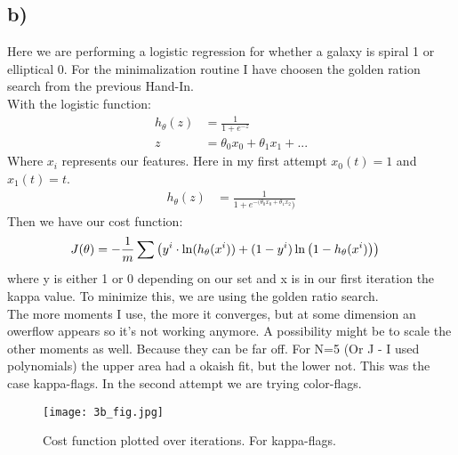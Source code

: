 \subsection{b)}
Here we are performing a logistic regression for whether a galaxy is spiral 1 or elliptical 0. For the minimalization routine I have choosen the golden ration search from the previous Hand-In. \\
With the logistic function: 
\begin{align}
    h_\theta(z) &= \frac{1}{1+e^{-z}}\\
    z &= \theta_0 x_0 + \theta_1 x_1 + ... 
\end{align}
Where $x_i$ represents our features. Here in my first attempt  $x_0(t) = 1$ and $x_{1}(t) = t$. 
\begin{align}
    h_\theta(z) &= \frac{1}{1+e^{-(\theta_0 x_0+ \theta_1 x_2})}
\end{align}
Then we have our cost function: 
\begin{align}
    J(\theta) &= - \frac{1}{m} \sum \left({y^{i}  \cdot \ln(h_\theta (x^{i})) + (1-y^{i})\ln\left({1-h_\theta(x^{i})}\right)}\right)
\end{align}
where y is either 1 or 0 depending on our set and x is in our first iteration the kappa value. To minimize this, we are using the golden ratio search. \\

The more moments I use, the more it converges, but at some dimension an owerflow appears so it's not working anymore. A possibility might be to scale the other moments as well. Because they can be far off. For N=5 (Or J - I used polynomials) the upper area had a okaish fit, but the lower not. This was the case kappa-flags. 
In the second attempt we are trying color-flags.

\begin{figure}[h!]
    \centering
    \texttt{[image: 3b\_fig.jpg]}
    \caption{Cost function plotted over iterations. For kappa-flags.}
\end{figure}


